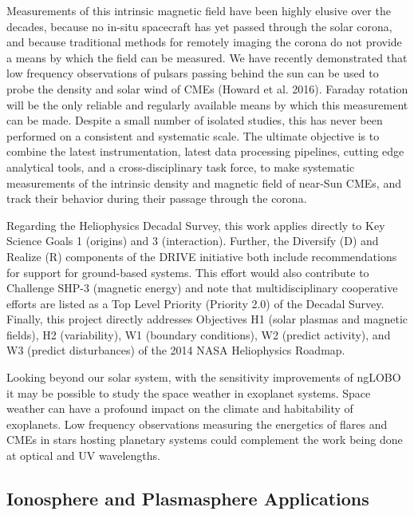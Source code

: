 \documentclass[11pt]{article}
\begin{document}
Measurements of this intrinsic magnetic field have been highly elusive over the decades, because no in-situ spacecraft has yet passed through the solar corona, and because traditional methods for remotely imaging the corona do not provide a means by which the field can be measured. We have recently demonstrated that low frequency observations of pulsars passing behind the sun can be used to probe the density and solar wind of CMEs (Howard et al. 2016).  Faraday rotation will be the only reliable and regularly available means by which this measurement can be made. Despite a small number of isolated studies, this has never been performed on a consistent and systematic scale. The ultimate objective is to combine the latest instrumentation, latest data processing pipelines, cutting edge analytical tools, and a cross-disciplinary task force, to make systematic measurements of the intrinsic density and magnetic field of near-Sun CMEs, and track their behavior during their passage through the corona.

Regarding the Heliophysics Decadal Survey, this work applies directly to Key Science Goals 1 (origins) and 3 (interaction). Further, the Diversify (D) and Realize (R) components of the DRIVE initiative both include recommendations for support for ground-based systems. This effort would also contribute to Challenge SHP-3 (magnetic energy) and note that multidisciplinary cooperative efforts are listed as a Top Level Priority (Priority 2.0) of the Decadal Survey. Finally, this project directly addresses Objectives H1 (solar plasmas and magnetic fields), H2 (variability), W1 (boundary conditions), W2 (predict activity), and W3 (predict disturbances) of the 2014 NASA Heliophysics Roadmap.

Looking beyond our solar system, with the sensitivity improvements of ngLOBO it may be possible to study the space weather in exoplanet systems.  Space weather can have a profound impact on the climate and habitability of exoplanets.  Low frequency observations measuring the energetics of flares and CMEs in stars hosting planetary systems could complement the work being done at optical and UV wavelengths.

\subsection{Ionosphere and Plasmasphere Applications}
\end{document}
